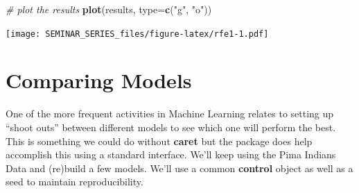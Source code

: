 \documentclass[]{book}
\newenvironment{Shaded}{\begin{snugshade}}{\end{snugshade}}
\newcommand{\KeywordTok}[1]{\textcolor[rgb]{0.13,0.29,0.53}{\textbf{#1}}}
\newcommand{\DataTypeTok}[1]{\textcolor[rgb]{0.13,0.29,0.53}{#1}}
\newcommand{\StringTok}[1]{\textcolor[rgb]{0.31,0.60,0.02}{#1}}
\newcommand{\CommentTok}[1]{\textcolor[rgb]{0.56,0.35,0.01}{\textit{#1}}}
\newcommand{\NormalTok}[1]{#1}
\begin{document}
\begin{Shaded}
\begin{Highlighting}[]
\CommentTok{# plot the results}
\KeywordTok{plot}\NormalTok{(results, }\DataTypeTok{type=}\KeywordTok{c}\NormalTok{(}\StringTok{"g"}\NormalTok{, }\StringTok{"o"}\NormalTok{))}
\end{Highlighting}
\end{Shaded}

\texttt{[image: SEMINAR\_SERIES\_files/figure-latex/rfe1-1.pdf]}

\chapter{Comparing Models}\label{comparing-models}

One of the more frequent activities in Machine Learning relates to
setting up ``shoot outs'' between different models to see which one will
perform the best. This is something we could do without \textbf{caret}
but the package does help accomplish this using a standard interface.
We'll keep using the Pima Indians Data and (re)build a few models. We'll
use a common \textbf{control} object as well as a seed to maintain
reproducibility.
\end{document}
